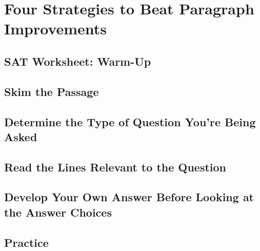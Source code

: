 \chapter{Four Strategies to Beat Paragraph Improvements}

\section{SAT Worksheet: Warm-Up}
\section{Skim the Passage}
\section{Determine the Type of Question You're Being Asked}
\section{Read the Lines Relevant to the Question}
\section{Develop Your Own Answer Before Looking at the Answer Choices}
\section{Practice}